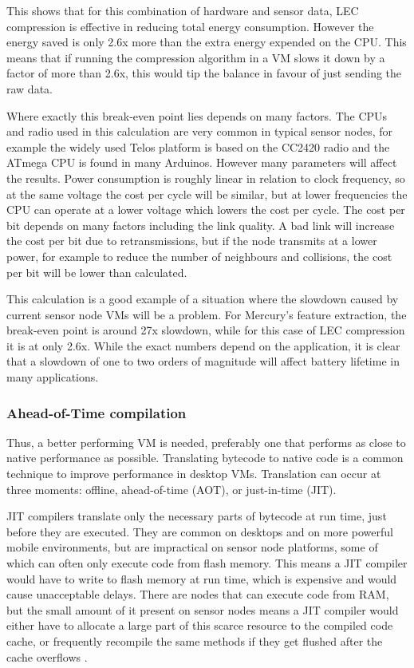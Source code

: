 This shows that for this combination of hardware and sensor data, LEC compression is effective in reducing total energy consumption. However the energy saved is only 2.6x more than the extra energy expended on the CPU. This means that if running the compression algorithm in a VM slows it down by a factor of more than 2.6x, this would tip the balance in favour of just sending the raw data.

Where exactly this break-even point lies depends on many factors. The CPUs and radio used in this calculation are very common in typical sensor nodes, for example the widely used Telos platform \cite{Polastre:2005ut} is based on the CC2420 radio and the ATmega CPU is found in many Arduinos. However many parameters will affect the results. Power consumption is roughly linear in relation to clock frequency, so at the same voltage the cost per cycle will be similar, but at lower frequencies the CPU can operate at a lower voltage which lowers the cost per cycle. The cost per bit depends on many factors including the link quality. A bad link will increase the cost per bit due to retransmissions, but if the node transmits at a lower power, for example to reduce the number of neighbours and collisions, the cost per bit will be lower than calculated.

This calculation is a good example of a situation where the slowdown caused by current sensor node VMs will be a problem. For Mercury's feature extraction, the break-even point is around 27x slowdown, while for this case of LEC compression it is at only 2.6x. While the exact numbers depend on the application, it is clear that a slowdown of one to two orders of magnitude will affect battery lifetime in many applications.

\subsubsection{Ahead-of-Time compilation}
Thus, a better performing VM is needed, preferably one that performs as close to native performance as possible. Translating bytecode to native code is a common technique to improve performance in desktop VMs. Translation can occur at three moments: offline, ahead-of-time (AOT), or just-in-time (JIT).

JIT compilers translate only the necessary parts of bytecode at run time, just before they are executed. They are common on desktops and on more powerful mobile environments, but are impractical on sensor node platforms, some of which can often only execute code from flash memory. This means a JIT compiler would have to write to flash memory at run time, which is expensive and would cause unacceptable delays. There are nodes that can execute code from RAM, but the small amount of it present on sensor nodes means a JIT compiler would either have to allocate a large part of this scarce resource to the compiled code cache, or frequently recompile the same methods if they get flushed after the cache overflows \cite{Ellul:2012thesis}.

